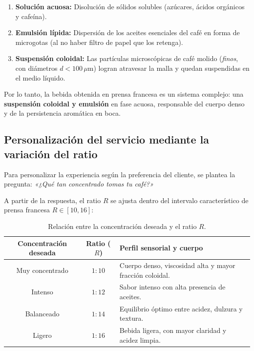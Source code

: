 \documentclass{article}
\begin{document}
\begin{enumerate}
	\item \textbf{Solución acuosa:} Disolución de sólidos solubles (azúcares, ácidos orgánicos y cafeína).
	\item \textbf{Emulsión lípida:} Dispersión de los aceites esenciales del café en forma de microgotas (al no haber filtro de papel que los retenga).
	\item \textbf{Suspensión coloidal:} Las partículas microscópicas de café molido (\emph{finos}, con diámetros $d < 100\,\mu\text{m}$) logran atravesar la malla y quedan suspendidas en el medio líquido.
\end{enumerate}

Por lo tanto, la bebida obtenida en prensa francesa es un sistema complejo: una \textbf{suspensión coloidal y emulsión} en fase acuosa, responsable del cuerpo denso y de la persistencia aromática en boca.

\subsection{Personalización del servicio mediante la variación del ratio}

Para personalizar la experiencia según la preferencia del cliente, se plantea la pregunta: \emph{«¿Qué tan concentrado tomas tu café?»}

A partir de la respuesta, el ratio $R$ se ajusta dentro del intervalo característico de prensa francesa $R \in [10, 16]$:

\begin{table}[H]
	\centering
	\caption{Relación entre la concentración deseada y el ratio $R$.}
	\label{tab:perfil_ratio}
	\vspace{6pt}
	\begin{tabular}{ccp{7cm}}
		\toprule
		\textbf{Concentración deseada} & \textbf{Ratio ($R$)} & \textbf{Perfil sensorial y cuerpo} \\
		\midrule
		Muy concentrado & $1:10$ & Cuerpo denso, viscosidad alta y mayor fracción coloidal. \\
		Intenso & $1:12$ & Sabor intenso con alta presencia de aceites. \\
		Balanceado & $1:14$ & Equilibrio óptimo entre acidez, dulzura y textura. \\
		Ligero & $1:16$ & Bebida ligera, con mayor claridad y acidez limpia. \\
		\bottomrule
	\end{tabular}
\end{table}
\end{document}
